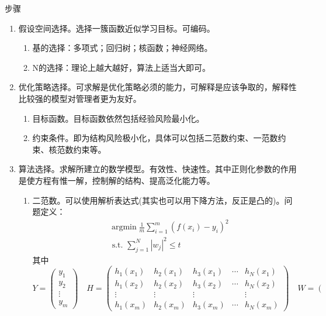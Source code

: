 \documentclass[10pt, a4paper]{article}
\begin{document}
步骤
\begin{enumerate}
	\item 假设空间选择。选择一簇函数近似学习目标。可编码。
	\begin{enumerate}
		\item 基的选择：多项式；回归树；核函数；神经网络。
		\item N的选择：理论上越大越好，算法上适当大即可。
	\end{enumerate}
	\item 优化策略选择。可求解是优化策略必须的能力，可解释是应该争取的，解释性比较强的模型对管理者更为友好。
	\begin{enumerate}
		\item 目标函数。目标函数依然包括经验风险最小化。
		\item 约束条件。即为结构风险极小化，具体可以包括二范数约束、一范数约束、核范数约束等。
	\end{enumerate}
	\item 算法选择。求解所建立的数学模型。有效性、快速性。其中正则化参数的作用是使方程有惟一解，控制解的结构、提高泛化能力等。
	\begin{enumerate}
		\item 二范数。可以使用解析表达式(其实也可以用下降方法，反正是凸的)。问题定义：$$
		\begin{aligned}
			&\operatorname{argmin} \frac{1}{m} \sum_{i=1}^{m}\left(f\left(x_{i}\right)-y_{i}\right)^{2} \\
			&\text { s.t. } \sum_{j=1}^{N}\left|w_{j}\right|^{2} \leq t
		\end{aligned}
		$$
		其中$$
		Y=\left(\begin{array}{c}
			y_{1} \\
			y_{2} \\
			\vdots \\
			y_{m}
		\end{array}\right) \quad H=\left(\begin{array}{ccccc}
			h_{1}\left(x_{1}\right) & h_{2}\left(x_{1}\right) & h_{3}\left(x_{1}\right) & \cdots & h_{N}\left(x_{1}\right) \\
			h_{1}\left(x_{2}\right) & h_{2}\left(x_{2}\right) & h_{3}\left(x_{2}\right) & \cdots & h_{N}\left(x_{2}\right) \\
			\vdots & \vdots & \vdots & & \vdots \\
			h_{1}\left(x_{m}\right) & h_{2}\left(x_{m}\right) & h_{3}\left(x_{m}\right) & \cdots & h_{N}\left(x_{m}\right)
		\end{array}\right) \quad W=\left(\begin{array}{c}

\end{array}$$
\end{enumerate}
\end{enumerate}
\end{document}
